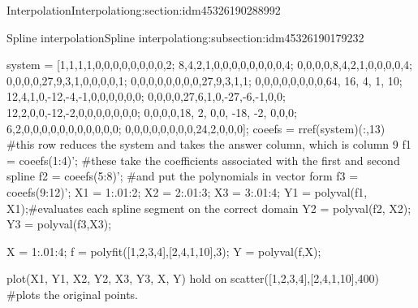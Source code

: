 \documentclass[oneside,10pt,]{article}
\numberwithin{equation}{section}
\numberwithin{equation}{section}
\begin{document}
\begin{sectionptx}{Interpolation}{}{Interpolation}{}{}{g:section:idm45326190288992}
\begin{subsectionptx}{Spline interpolation}{}{Spline interpolation}{}{}{g:subsection:idm45326190179232}
\begin{sageinput}
system = [1,1,1,1,0,0,0,0,0,0,0,0,2;
           8,4,2,1,0,0,0,0,0,0,0,0,4;
           0,0,0,0,8,4,2,1,0,0,0,0,4;
           0,0,0,0,27,9,3,1,0,0,0,0,1;
           0,0,0,0,0,0,0,0,27,9,3,1,1;
           0,0,0,0,0,0,0,0,64, 16, 4, 1, 10;
           12,4,1,0,-12,-4,-1,0,0,0,0,0,0;
           0,0,0,0,27,6,1,0,-27,-6,-1,0,0;
           12,2,0,0,-12,-2,0,0,0,0,0,0,0;
           0,0,0,0,18, 2, 0,0, -18, -2, 0,0,0;
           6,2,0,0,0,0,0,0,0,0,0,0,0;
           0,0,0,0,0,0,0,0,24,2,0,0,0];
coeefs = rref(system)(:,13) #this row reduces the system and takes the answer column, which is column 9
f1 = coeefs(1:4)'; #these take the coefficients associated with the first and second spline
f2 = coeefs(5:8)'; #and put the polynomials in vector form
f3 = coeefs(9:12)';
X1 = 1:.01:2;
X2 = 2:.01:3;
X3 = 3:.01:4;
Y1 = polyval(f1, X1);#evaluates each spline segment on the correct domain
Y2 = polyval(f2, X2);
Y3 = polyval(f3,X3);

X = 1:.01:4;
f = polyfit([1,2,3,4],[2,4,1,10],3);
Y = polyval(f,X);

plot(X1, Y1, X2, Y2, X3, Y3, X, Y)
hold on
scatter([1,2,3,4],[2,4,1,10],400) #plots the original points.
\end{sageinput}
%
\end{subsectionptx}
\end{sectionptx}
%
%
\typeout{************************************************}
\typeout{************************************************}
%
\end{document}
